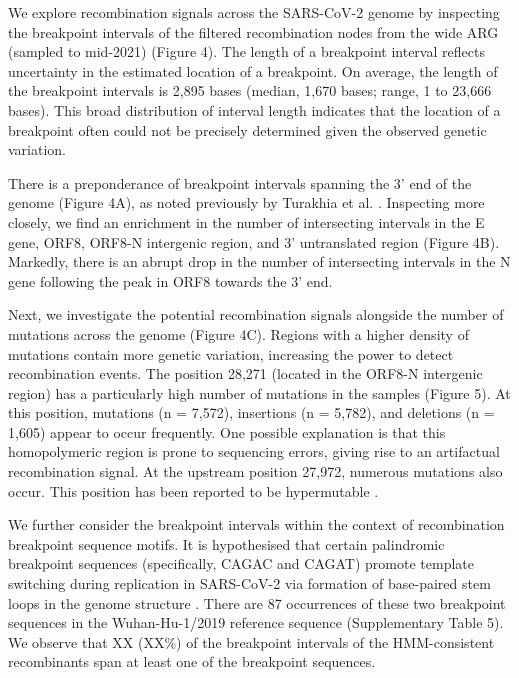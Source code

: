 \documentclass{article}
\begin{document}
We explore recombination signals across the SARS-CoV-2 genome by inspecting the breakpoint intervals of the filtered recombination nodes from the wide ARG (sampled to mid-2021) (Figure 4). The length of a breakpoint interval reflects uncertainty in the estimated location of a breakpoint. On average, the length of the breakpoint intervals is 2,895 bases (median, 1,670 bases; range, 1 to 23,666 bases). This broad distribution of interval length indicates that the location of a breakpoint often could not be precisely determined given the observed genetic variation.

There is a preponderance of breakpoint intervals spanning the 3’ end of the genome (Figure 4A), as noted previously by Turakhia et al. \cite{Turakhia2022-it}. Inspecting more closely, we find an enrichment in the number of intersecting intervals in the E gene, ORF8, ORF8-N intergenic region, and 3’ untranslated region (Figure 4B). Markedly, there is an abrupt drop in the number of intersecting intervals in the N gene following the peak in ORF8 towards the 3’ end.

Next, we investigate the potential recombination signals alongside the number of mutations across the genome (Figure 4C). Regions with a higher density of mutations contain more genetic variation, increasing the power to detect recombination events. The position 28,271 (located in the ORF8-N intergenic region) has a particularly high number of mutations in the samples (Figure 5). At this position, mutations (n = 7,572), insertions (n = 5,782), and deletions (n = 1,605) appear to occur frequently. One possible explanation is that this homopolymeric region is prone to sequencing errors, giving rise to an artifactual recombination signal. At the upstream position 27,972, numerous mutations also occur. This position has been reported to be hypermutable \cite{Jungreis2021-dh}.

We further consider the breakpoint intervals within the context of recombination breakpoint sequence motifs. It is hypothesised that certain palindromic breakpoint sequences (specifically, CAGAC and CAGAT) promote template switching during replication in SARS-CoV-2 via formation of base-paired stem loops in the genome structure \cite{Gallaher2020-lb}. There are 87 occurrences of these two breakpoint sequences in the Wuhan-Hu-1/2019 reference sequence (Supplementary Table 5). We observe that XX (XX\%) of the breakpoint intervals of the HMM-consistent recombinants span at least one of the breakpoint sequences.
\end{document}
